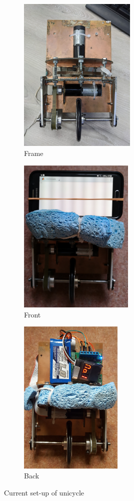 \documentclass[twoside,twocolumn,12pt]{article}
\begin{document}
\begin{figure}[t!]
  \centering
  \begin{subfigure}[t]{0.325\textwidth}
    \includegraphics[width=\linewidth,height=7.5cm]{uni_old_mech}
   \caption{Frame}
  \label{sub:frameold}
  \end{subfigure}
  \begin{subfigure}[t]{0.325\textwidth}
    \includegraphics[width=\linewidth,height=7.5cm]{old1}
    \caption{Front \cite{arsalan}}
  \label{sub:frontold}
  \end{subfigure}
  \begin{subfigure}[t]{0.325\textwidth}
    \includegraphics[width=\linewidth,height=7.5cm]{old2}
    \caption{Back \cite{arsalan}}
  \label{sub:backold}
  \end{subfigure}
  \caption{Current set-up of unicycle}
  \label{fig:current}
\end{figure}
\end{document}
